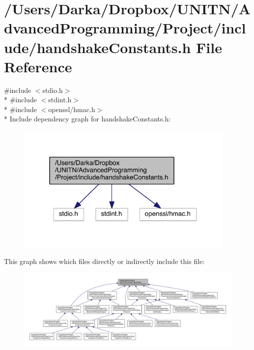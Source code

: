\section{/\+Users/\+Darka/\+Dropbox/\+U\+N\+I\+T\+N/\+Advanced\+Programming/\+Project/include/handshake\+Constants.h File Reference}
\label{handshake_constants_8h}
{\ttfamily \#include $<$stdio.\+h$>$}\\*
{\ttfamily \#include $<$stdint.\+h$>$}\\*
{\ttfamily \#include $<$openssl/hmac.\+h$>$}\\*
Include dependency graph for handshake\+Constants.\+h\+:\nopagebreak
\begin{figure}[H]
\begin{center}
\leavevmode
\includegraphics[width=304pt]{handshake_constants_8h__incl}
\end{center}
\end{figure}
This graph shows which files directly or indirectly include this file\+:\nopagebreak
\begin{figure}[H]
\begin{center}
\leavevmode
\includegraphics[width=350pt]{handshake_constants_8h__dep__incl}
\end{center}
\end{figure}
